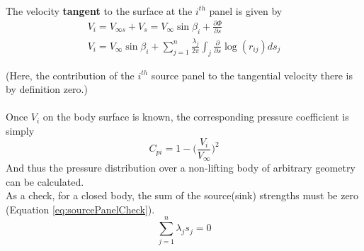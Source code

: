 \documentclass[draft=false, titlepage]{article}
\newcommand{\partialfrac}[2]{\frac{\partial #1}{\partial #2}}
\begin{document}
\paragraph*{} The velocity \textbf{tangent} to the surface at the $i^{th}$ panel is given by
\begin{gather*}
    V_i = V_{\infty s} + V_s = V_\infty \sin\beta_i + \partialfrac{\Phi}{s}\\
    V_i = V_\infty\sin\beta_i + \sum_{j=1}^n \frac{\lambda_j}{2\pi} \int_j \partialfrac{}{s} \log(r_{ij}) ds_j
\end{gather*}

(Here, the contribution of the $i^{th}$ source panel to the tangential velocity there is by definition zero.)
\paragraph*{}
Once $V_i$ on the body surface is known, the corresponding pressure coefficient is simply
\begin{equation*}
    C_{pi} = 1-\Big(\frac{V_i}{V_\infty}\Big)^2
\end{equation*}
And thus the pressure distribution over a non-lifting body of arbitrary geometry can be calculated.\\
As a check, for a closed body, the sum of the source(sink) strengths must be zero (Equation \ref{eq:sourcePanelCheck}).
\begin{equation}
    \sum_{j=1}^n \lambda_j s_j = 0
    \label{eq:sourcePanelCheck}
\end{equation}
\end{document}

